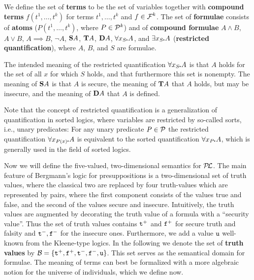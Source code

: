 \documentclass{\filespath jancl}
\def\Funcs{{\mbox{$\cF$}}}
\def\sdot{\rule{.3ex}{.3ex}\hspace{-0.4ex}\;} %
\def\lnot{\neg}
\newcommand{\undefined}{{\sf u}}
\newcommand{\twts}{{{\sf t}^+}}
\newcommand{\twfs}{{{\sf f}^+}}
\newcommand{\twti}{{{\sf t}^-}}
\newcommand{\twfi}{{{\sf f}^-}}
\newcommand{\Tval}{{\cal B}}
\def\presuppl{{\cal P\kern-.4ex L}}
\def\Preds{{\cal P}}
\def\tf{{\bf D}}
\def\holds{{\bf T}}
\def\deft{{\bf S}}
\def\sf{\tt}
\begin{document}
\begin{definition}
  We define the set of {\bf terms} to be the set of variables together
  with {\bf compound terms} $f(t^1,\ldots,t^k)$ for terms
  $t^1,\ldots,t^k$ and $f\in\Funcs^k$. The set of\/ {\bf formulae}
  consists of\/ {\bf atoms} ($P(t^1,\ldots,t^k)$, where
  $P\in\Preds^k$) and of\/ {\bf compound formulae} $A\land B$, $A\lor
  B$, $A\implies B$, $\lnot A$, $\deft A$, $\holds A$, $\tf A$,
  $\forall x_S\sdot A$, and $\exists x_S\sdot A$ ({\bf restricted
    quantification}), where $A$, $B$, and $S$ are formulae.
\end{definition}

  The intended meaning of the restricted quantification $\forall
  x_S\sdot A$ is that $A$ holds for the set of all $x$ for which $S$
  holds, and that furthermore this set is nonempty. The meaning of
  $\deft A$ is that $A$ is secure, the meaning of $\holds A$ that $A$ holds,
  but may be insecure, and the meaning of $\tf A$ that $A$ is defined.

Note that the concept of restricted quantification is a generalization of
quantification in sorted logics, where variables are restricted by so-called sorts, i.e., unary
predicates: For any unary predicate $P\in\Preds$ the restricted quantification
$\forall x_{P(x)}\sdot A$ is equivalent to the sorted quantification $\forall
x_P\sdot A$, which is generally used in the field of sorted logics.

Now we will define the five-valued, two-dimensional semantics for $\presuppl$.
The main feature of Bergmann's logic for presuppositions is a two-dimensional
set of truth values, where the classical two are replaced by four truth-values
which are represented by pairs, where the first component consists of the
values true and false, and the second of the values secure and insecure.
Intuitively, the truth values are augmented by decorating the truth value of a
formula with a ``security value''. Thus the set of truth values contains
$\twts$ and $\twfs$ for secure truth and falsity and $\twti,\twfi$ for the
insecure ones.  Furthermore, we add a value $\undefined$ well-known from the
Kleene-type logics.  In the following we denote the set of {\bf truth values}
by $\Tval=\{\twts,\twfs,\twti,\twfi,\undefined\}$. 
This set serves as the semantical domain for formulae. The meaning of terms
can best be formalized with a more algebraic notion for the universe of
individuals, which we define now.
\end{document}
